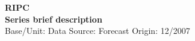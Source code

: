 \documentclass[a4paper,12pt]{article}
\begin{document}
\thispagestyle{empty}
\begin{landscape}
\begin{center}

\textbf{RIPC} \\ 

\textbf{Series brief description} \\ 

Base/Unit: 
\space \space \space Data Source:  
\space \space \space Forecast Origin: 12/2007 \\ 
\end{center}

\begin{small}   \end{small} 

\end{landscape}
\end{document}
